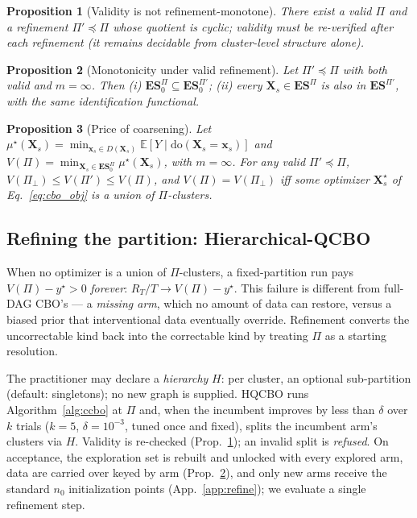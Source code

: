 \documentclass[twoside]{article}
\newtheorem{proposition}{Proposition}
\newcommand{\E}{\mathbb{E}}
\newcommand{\doo}{\mathrm{do}}
\newcommand{\QCBO}{\textsc{QCBO}}
\newcommand{\HQCBO}{\textsc{HQCBO}}
\newcommand{\CBO}{\textsc{CBO}}
\newcommand{\ES}{\mathbf{ES}}
\newcommand{\ESpi}{\mathbf{ES}^{\Pi}}
\begin{document}
\begin{proposition}[Validity is not refinement-monotone]
\label{prop:refinement_validity}
There exist a valid $\Pi$ and a refinement $\Pi'\preceq\Pi$ whose quotient is cyclic; validity must be re-verified after each refinement (it remains decidable from cluster-level structure alone).
\end{proposition}

\begin{proposition}[Monotonicity under valid refinement]
\label{prop:refinement}
Let $\Pi'\preceq\Pi$ with both valid and $m=\infty$. Then (i) $\ESpi_0\subseteq\ES^{\Pi'}_{0}$; (ii) every $\mathbf{X}_s\in\ESpi$ is also in $\ES^{\Pi'}$, with the same identification functional.
\end{proposition}

\begin{proposition}[Price of coarsening]
\label{prop:price}
Let $\mu^\star(\mathbf{X}_s)=\min_{\mathbf{x}_s\in D(\mathbf{X}_s)} \E[Y\mid\doo(\mathbf{X}_s=\mathbf{x}_s)]$ and $V(\Pi)=\min_{\mathbf{X}_s\in\ESpi_0}\mu^\star(\mathbf{X}_s)$, with $m=\infty$. For any valid $\Pi'\preceq\Pi$, $V(\Pi_\bot)\le V(\Pi')\le V(\Pi)$, and $V(\Pi)=V(\Pi_\bot)$ iff some optimizer $\mathbf{X}_s^\star$ of Eq.~\eqref{eq:cbo_obj} is a union of $\Pi$-clusters.
\end{proposition}

\subsection{Refining the partition: Hierarchical-\QCBO{}}
\label{sec:refine}
When no optimizer is a union of $\Pi$-clusters, a fixed-partition run pays $V(\Pi)-y^\star>0$ \emph{forever}: $R_T/T\to V(\Pi)-y^\star$. This failure is different from full-DAG \CBO{}'s --- a \emph{missing arm}, which no amount of data can restore, versus a biased prior that interventional data eventually override. Refinement converts the uncorrectable kind back into the correctable kind by treating $\Pi$ as a starting resolution.

The practitioner may declare a \emph{hierarchy} $H$: per cluster, an optional sub-partition (default: singletons); no new graph is supplied. \HQCBO{} runs Algorithm~\ref{alg:ccbo} at $\Pi$ and, when the incumbent improves by less than $\delta$ over $k$ trials ($k{=}5$, $\delta{=}10^{-3}$, tuned once and fixed), splits the incumbent arm's clusters via $H$. Validity is re-checked (Prop.~\ref{prop:refinement_validity}); an invalid split is \emph{refused}. On acceptance, the exploration set is rebuilt and unlocked with every explored arm, data are carried over keyed by arm (Prop.~\ref{prop:refinement}), and only new arms receive the standard $n_0$ initialization points (App.~\ref{app:refine}); we evaluate a single refinement step.
\end{document}
